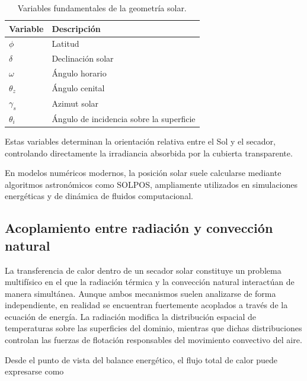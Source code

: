 \begin{table}[h!]
\centering
\caption{Variables fundamentales de la geometría solar.}
\begin{tabular}{ll}
\toprule
Variable & Descripción\\
\midrule

$\phi$ & Latitud\\

$\delta$ & Declinación solar\\

$\omega$ & Ángulo horario\\

$\theta_z$ & Ángulo cenital\\

$\gamma_s$ & Azimut solar\\

$\theta_i$ & Ángulo de incidencia sobre la superficie\\

\bottomrule
\end{tabular}
\end{table}



Estas variables determinan la orientación relativa entre el Sol y el secador, controlando directamente la irradiancia absorbida por la cubierta transparente.

En modelos numéricos modernos, la posición solar suele calcularse mediante algoritmos astronómicos como SOLPOS, ampliamente utilizados en simulaciones energéticas y de dinámica de fluidos computacional. 

\subsection{Acoplamiento entre radiación y convección natural}

La transferencia de calor dentro de un secador solar constituye un problema multifísico en el que la radiación térmica y la convección natural interactúan de manera simultánea. Aunque ambos mecanismos suelen analizarse de forma independiente, en realidad se encuentran fuertemente acoplados a través de la ecuación de energía. La radiación modifica la distribución espacial de temperaturas sobre las superficies del dominio, mientras que dichas distribuciones controlan las fuerzas de flotación responsables del movimiento convectivo del aire.

Desde el punto de vista del balance energético, el flujo total de calor puede expresarse como

